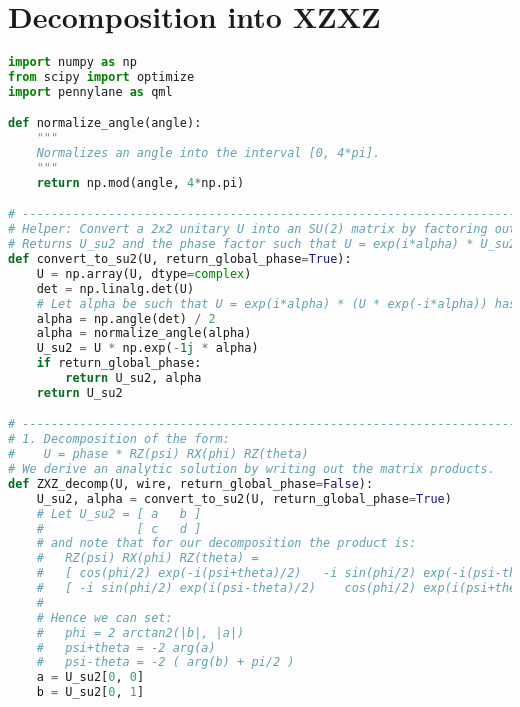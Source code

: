 \documentclass[12pt,twoside]{report}  %
\begin{document}
\clearpage



\appendix

\chapter{Decomposition into XZXZ}
\label{one_qubit_Decomp}

\begin{lstlisting}[language=Python, caption={Python code for one_qubit_decomposition.}]
import numpy as np
from scipy import optimize
import pennylane as qml

def normalize_angle(angle):
    """
    Normalizes an angle into the interval [0, 4*pi].
    """
    return np.mod(angle, 4*np.pi)

# -----------------------------------------------------------------------------
# Helper: Convert a 2x2 unitary U into an SU(2) matrix by factoring out a global phase.
# Returns U_su2 and the phase factor such that U = exp(i*alpha) * U_su2.
def convert_to_su2(U, return_global_phase=True):
    U = np.array(U, dtype=complex)
    det = np.linalg.det(U)
    # Let alpha be such that U = exp(i*alpha) * (U * exp(-i*alpha)) has determinant 1.
    alpha = np.angle(det) / 2
    alpha = normalize_angle(alpha)
    U_su2 = U * np.exp(-1j * alpha)
    if return_global_phase:
        return U_su2, alpha
    return U_su2

# -----------------------------------------------------------------------------
# 1. Decomposition of the form:
#    U = phase * RZ(psi) RX(phi) RZ(theta)
# We derive an analytic solution by writing out the matrix products.
def ZXZ_decomp(U, wire, return_global_phase=False):
    U_su2, alpha = convert_to_su2(U, return_global_phase=True)
    # Let U_su2 = [ a   b ]
    #             [ c   d ]
    # and note that for our decomposition the product is:
    #   RZ(psi) RX(phi) RZ(theta) = 
    #   [ cos(phi/2) exp(-i(psi+theta)/2)   -i sin(phi/2) exp(-i(psi-theta)/2) ]
    #   [ -i sin(phi/2) exp(i(psi-theta)/2)    cos(phi/2) exp(i(psi+theta)/2)  ]
    #
    # Hence we can set:
    #   phi = 2 arctan2(|b|, |a|)
    #   psi+theta = -2 arg(a)
    #   psi-theta = -2 ( arg(b) + pi/2 )
    a = U_su2[0, 0]
    b = U_su2[0, 1]
    

\end{lstlisting}
\end{document}
